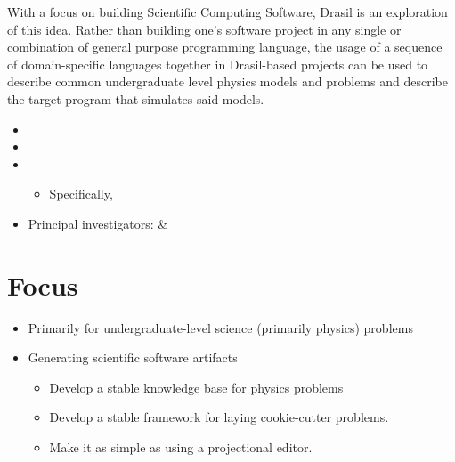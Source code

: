 With a focus on building Scientific Computing Software,
Drasil\thinspace\cite{Drasil2021} is an exploration of this idea. Rather than
building one's software project in any single or combination of general purpose
programming language, the usage of a sequence of domain-specific languages
together in Drasil-based projects can be used to describe common undergraduate
level physics models and problems and describe the target program that simulates
said models.

\begin{itemize}
    \item {}
    \item {}
    \item {}
          \begin{itemize}
              \item Specifically, 
          \end{itemize}
    \item Principal investigators:  \& 
\end{itemize}

\section{Focus}

\begin{itemize}
    \item Primarily for undergraduate-level science (primarily physics) problems
    \item Generating scientific software artifacts
          \begin{itemize}
              \item Develop a stable knowledge base for physics problems
              \item Develop a stable framework for laying cookie-cutter
                    problems.
              \item Make it as simple as using a projectional editor.
          \end{itemize}
\end{itemize}

